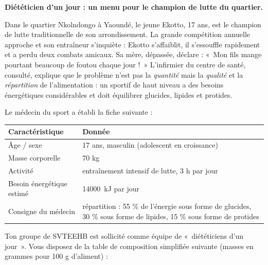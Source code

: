 \documentclass[11pt]{article}
\newcommand{\cle}[1]{{\popxbold\color{popdark}#1}}
\newcounter{popsec}
\newcounter{popsub}
\newcommand{\courssub}[1]{%
  \stepcounter{popsub}%
  \par\vspace{9pt}\noindent{\popxbold\fontsize{11.5}{13}\selectfont\color{popink}{\color{poporange}\thepopsec.\thepopsub}\hspace{6pt}#1}\par\nopagebreak\vspace{4pt}
}
\begin{document}
\courssub{Situation}

\textbf{Diététicien d'un jour : un menu pour le champion de lutte du quartier.}

Dans le quartier Nkolndongo à Yaoundé, le jeune \cle{Ekotto}, 17 ans, est le champion de lutte traditionnelle de son arrondissement. La grande compétition annuelle approche et son entraîneur s'inquiète : Ekotto s'affaiblit, il s'essouffle rapidement et a perdu deux combats amicaux. Sa mère, dépassée, déclare : «~Mon fils mange pourtant beaucoup de foutou chaque jour !~» L'infirmier du centre de santé, consulté, explique que le problème n'est pas la \emph{quantité} mais la \emph{qualité} et la \emph{répartition} de l'alimentation : un sportif de haut niveau a des besoins énergétiques considérables et doit équilibrer glucides, lipides et protides.

Le médecin du sport a établi la fiche suivante :

\begin{center}
\begin{tabularx}{\linewidth}{|l|X|}
\hline
\rowcolor{popblueL} \textbf{Caractéristique} & \textbf{Donnée} \\
\hline
Âge / sexe & 17 ans, masculin (adolescent en croissance) \\
\hline
Masse corporelle & 70 kg \\
\hline
Activité & entraînement intensif de lutte, 3 h par jour \\
\hline
Besoin énergétique estimé & \SI{14000}{kJ} par jour \\
\hline
Consigne du médecin & répartition : 55 \% de l'énergie sous forme de glucides, 30 \% sous forme de lipides, 15 \% sous forme de protides \\
\hline
\end{tabularx}
\end{center}

Ton groupe de SVTEEHB est sollicité comme équipe de «~diététiciens d'un jour~». Vous disposez de la table de composition simplifiée suivante (masses en grammes pour 100 g d'aliment) :
\end{document}
